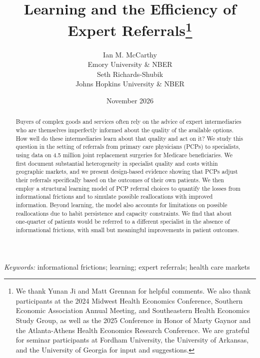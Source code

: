 \documentclass[12pt]{article}
\begin{document}
\title{Learning and the Efficiency of Expert Referrals\thanks{We thank Yunan Ji and Matt Grennan for helpful comments. We also thank participants at the 2024 Midwest Health Economics Conference, Southern Economic Association Annual Meeting, and Southeastern Health Economics Study Group, as well as the 2025 Conference in Honor of Marty Gaynor and the Atlanta-Athens Health Economics Research Conference. We are grateful for seminar participants at Fordham University, the University of Arkansas, and the University of Georgia for input and suggestions.}}
\author{%
  Ian M. McCarthy \\[-1.5ex]
  Emory University \& NBER \\
  Seth Richards-Shubik \\[-1.5ex]
  Johns Hopkins University \& NBER
}
\date{November 2026}
\maketitle

\vspace{-2ex}
\begin{abstract}
\singlespacing
\noindent Buyers of complex goods and services often rely on the advice of expert intermediaries who are themselves imperfectly informed about the quality of the available options. How well do these intermediaries learn about that quality and act on it? We study this question in the setting of referrals from primary care physicians (PCPs) to specialists, using data on 4.5 million joint replacement surgeries for Medicare beneficiaries. We first document substantial heterogeneity in specialist quality and costs within geographic markets, and we present design-based evidence showing that PCPs adjust their referrals specifically based on the outcomes of their own patients. We then employ a structural learning model of PCP referral choices to quantify the losses from informational frictions and to simulate possible reallocations with improved information. Beyond learning, the model also accounts for limitations on possible reallocations due to habit persistence and capacity constraints. We find that about one-quarter of patients would be referred to a different specialist in the absence of informational frictions, with small but meaningful improvements in patient outcomes.
\end{abstract}

\medskip
\noindent \textit{Keywords:} informational frictions; learning; expert referrals; health care markets
\end{document}
